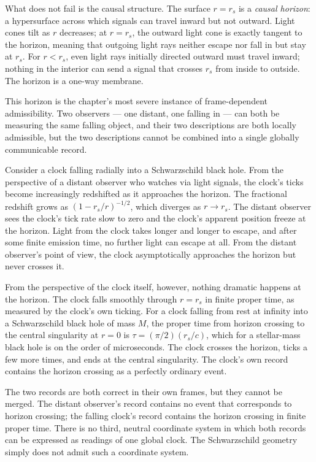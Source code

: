 What does not fail is the causal structure. The surface $r = r_s$ is a
\emph{causal horizon}: a hypersurface across which signals can travel inward
but not outward. Light cones tilt as $r$ decreases; at $r = r_s$, the
outward light cone is exactly tangent to the horizon, meaning that outgoing
light rays neither escape nor fall in but stay at $r_s$. For $r < r_s$, even
light rays initially directed outward must travel inward; nothing in the
interior can send a signal that crosses $r_s$ from inside to outside. The
horizon is a one-way membrane.

This horizon is the chapter's most severe instance of frame-dependent
admissibility. Two observers --- one distant, one falling in --- can both be
measuring the same falling object, and their two descriptions are both
locally admissible, but the two descriptions cannot be combined into a single
globally communicable record.

Consider a clock falling radially into a Schwarzschild black hole. From the
perspective of a distant observer who watches via light signals, the clock's
ticks become increasingly redshifted as it approaches the horizon. The
fractional redshift grows as $(1 - r_s/r)^{-1/2}$, which diverges as $r
\to r_s$. The distant observer sees the clock's tick rate slow to zero and
the clock's apparent position freeze at the horizon. Light from the clock
takes longer and longer to escape, and after some finite emission time, no
further light can escape at all. From the distant observer's point of view,
the clock asymptotically approaches the horizon but never crosses it.

From the perspective of the clock itself, however, nothing dramatic happens
at the horizon. The clock falls smoothly through $r = r_s$ in finite
proper time, as measured by the clock's own ticking. For a clock falling
from rest at infinity into a Schwarzschild black hole of mass $M$, the
proper time from horizon crossing to the central singularity at $r = 0$ is
$\tau = (\pi/2)(r_s/c)$, which for a stellar-mass black hole is on the
order of microseconds. The clock crosses the horizon, ticks a few more
times, and ends at the central singularity. The clock's own record contains
the horizon crossing as a perfectly ordinary event.

The two records are both correct in their own frames, but they cannot be
merged. The distant observer's record contains no event that corresponds to
horizon crossing; the falling clock's record contains the horizon crossing
in finite proper time. There is no third, neutral coordinate system in which
both records can be expressed as readings of one global clock. The
Schwarzschild geometry simply does not admit such a coordinate system.

